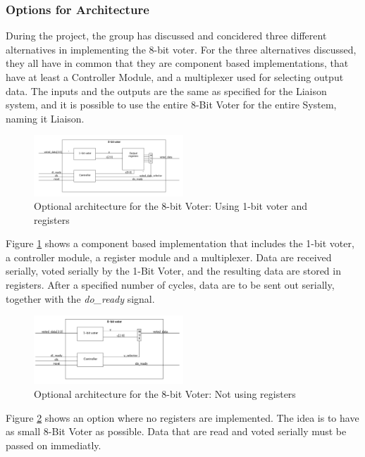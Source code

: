 \documentclass[a4paper]{IEEEtran}
\begin{document}
\subsubsection{Options for Architecture}
During the project, the group has discussed and concidered three different alternatives in implementing the 8-bit voter.
For the three alternatives discussed, they all have in common that they are component based implementations, that have at least a Controller Module, and a multiplexer used for selecting output data.
The inputs and the outputs are the same as specified for the Liaison system, and it is possible to use the entire 8-Bit Voter for the entire System, naming it Liaison. 

\begin{figure}[h!]
    \centering
    \includegraphics[width=0.5\textwidth]{Figures/Solution/ArchitectureOption1}
    \caption{Optional architecture for the 8-bit Voter: Using 1-bit voter and registers}
    \label{fig:ArchitectureOption1}
\end{figure}
Figure \ref{fig:ArchitectureOption1} shows a component based implementation that includes the 1-bit voter, a controller module, a register module and a multiplexer. Data are received serially, voted serially by the 1-Bit Voter, and the resulting data are stored in registers. After a specified number of cycles, data are to be sent out serially, together with the \textit{do\_ready} signal.
\begin{figure}[h!]
    \centering
    \includegraphics[width=0.5\textwidth]{Figures/Solution/ArchitectureOption2}
    \caption{Optional architecture for the 8-bit Voter: Not using registers}
    \label{fig:ArchitectureOption2}
\end{figure}
Figure \ref{fig:ArchitectureOption2} shows an option where no registers are implemented. 
The idea is to have as small 8-Bit Voter as possible. 
Data that are read and voted serially must be passed on immediatly.
\end{document}
